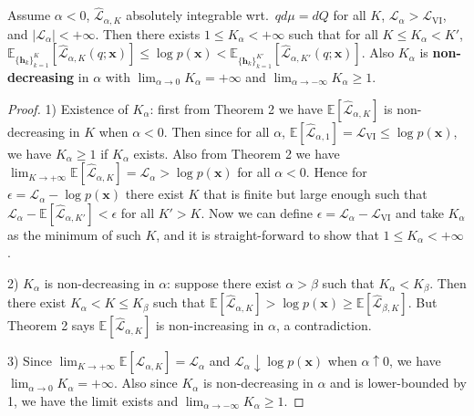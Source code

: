 \begin{lemma}
Assume $\alpha < 0$, $\hat{\mathcal{L}}_{\alpha, K}$ absolutely integrable wrt.~$qd\mu = dQ$ for all $K$, $\mathcal{L}_{\alpha} > \mathcal{L}_{\text{VI}}$, and $|\mathcal{L}_{\alpha}| < +\infty$. Then there exists $1 \leq K_{\alpha} < +\infty$ such that for all $K \leq K_{\alpha} < K'$, $\mathbb{E}_{\{\bm{h}_k\}_{k=1}^K} [ \hat{\mathcal{L}}_{\alpha, K}(q; \bm{x}) ] \leq \log p(\bm{x}) < \mathbb{E}_{\{\bm{h}_k\}_{k=1}^{K'}} [ \hat{\mathcal{L}}_{\alpha, K'}(q; \bm{x}) ]$. Also $K_{\alpha}$ is \textbf{non-decreasing} in $\alpha$ with $\lim_{\alpha \rightarrow 0} K_{\alpha} = + \infty$ and $\lim_{\alpha \rightarrow -\infty} K_{\alpha} \geq 1$.
\label{lemma:alpha_k_existence}
\end{lemma}

\begin{proof}
%
1) Existence of $K_{\alpha}$: first from Theorem 2 we have $\mathbb{E}[\hat{\mathcal{L}}_{\alpha, K}]$ is non-decreasing in $K$ when $\alpha < 0$. Then since for all $\alpha$, $\mathbb{E}[\hat{\mathcal{L}}_{\alpha, 1}] = \mathcal{L}_{\text{VI}} \leq \log p(\bm{x})$, we have $K_{\alpha} \geq 1$ if $K_{\alpha}$ exists. Also from Theorem 2 we have $\lim_{K \rightarrow +\infty} \mathbb{E}[\hat{\mathcal{L}}_{\alpha, K}] = \mathcal{L}_{\alpha} > \log p(\bm{x})$ for all $\alpha < 0$. Hence for $\epsilon = \mathcal{L}_{\alpha} - \log p(\bm{x})$ there exist $K$ that is finite but large enough such that $\mathcal{L}_{\alpha} - \mathbb{E}[\hat{\mathcal{L}}_{\alpha, K'}] < \epsilon$ for all $K' > K$. Now we can define $\epsilon = \mathcal{L}_{\alpha} - \mathcal{L}_{\text{VI}}$ and take $K_{\alpha}$ as the minimum of such $K$, and it is straight-forward to show that $1 \leq K_{\alpha} < +\infty$. 

%
2) $K_{\alpha}$ is non-decreasing in $\alpha$: suppose there exist $\alpha > \beta$ such that $K_{\alpha} < K_{\beta}$. Then there exist $K_{\alpha} < K \leq K_{\beta}$ such that $\mathbb{E}[\hat{\mathcal{L}}_{\alpha, K}] > \log p(\bm{x}) \geq \mathbb{E}[\hat{\mathcal{L}}_{\beta, K}]$. But Theorem 2 says $\mathbb{E}[\hat{\mathcal{L}}_{\alpha, K}]$ is non-increasing in $\alpha$, a contradiction. 

%
3) Since $\lim_{K \rightarrow +\infty} \mathbb{E}[\hat{\mathcal{L}}_{\alpha, K}] = \mathcal{L}_{\alpha}$ and $\mathcal{L}_{\alpha} \downarrow \log p(\bm{x})$ when $\alpha \uparrow 0$, we have $\lim_{\alpha \rightarrow 0} K_{\alpha} = +\infty$. Also since $K_{\alpha}$ is non-decreasing in $\alpha$ and is lower-bounded by 1, we have the limit exists and $\lim_{\alpha \rightarrow -\infty} K_{\alpha} \geq 1$.
\end{proof}

